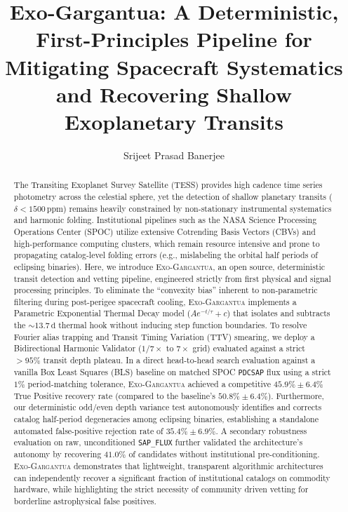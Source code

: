\documentclass[twocolumn,linenumbers]{aastex701}
\begin{document}
\title{Exo-Gargantua: A Deterministic, First-Principles Pipeline for Mitigating Spacecraft Systematics and Recovering Shallow Exoplanetary Transits}

\author[0009-0009-5889-9550]{Srijeet Prasad Banerjee}

\begin{abstract}
The Transiting Exoplanet Survey Satellite (TESS) provides high cadence time series photometry across the celestial sphere, yet the detection of shallow planetary transits ($\delta < 1500\,\text{ppm}$) remains heavily constrained by non-stationary instrumental systematics and harmonic folding. Institutional pipelines such as the NASA Science Processing Operations Center (SPOC) utilize extensive Cotrending Basis Vectors (CBVs) and high-performance computing clusters, which remain resource intensive and prone to propagating catalog-level folding errors (e.g., mislabeling the orbital half periods of eclipsing binaries). Here, we introduce \textsc{Exo-Gargantua}, an open source, deterministic transit detection and vetting pipeline, engineered strictly from first physical and signal processing principles. To eliminate the ``convexity bias'' inherent to non-parametric filtering during post-perigee spacecraft cooling, \textsc{Exo-Gargantua} implements a Parametric Exponential Thermal Decay model ($A e^{-t/\tau} + c$) that isolates and subtracts the $\sim 13.7\,\text{d}$ thermal hook without inducing step function boundaries. To resolve Fourier alias trapping and Transit Timing Variation (TTV) smearing, we deploy a Bidirectional Harmonic Validator ($1/7\times$ to $7\times$ grid) evaluated against a strict $>95\%$ transit depth plateau. In a direct head-to-head search evaluation against a vanilla Box Least Squares (BLS) baseline on matched SPOC \texttt{PDCSAP} flux using a strict $1\%$ period-matching tolerance, \textsc{Exo-Gargantua} achieved a competitive $45.9\% \pm 6.4\%$ True Positive recovery rate (compared to the baseline's $50.8\% \pm 6.4\%$). Furthermore, our deterministic odd/even depth variance test autonomously identifies and corrects catalog half-period degeneracies among eclipsing binaries, establishing a standalone automated false-positive rejection rate of $35.4\% \pm 6.9\%$. A secondary robustness evaluation on raw, unconditioned \texttt{SAP\_FLUX} further validated the architecture's autonomy by recovering $41.0\%$ of candidates without institutional pre-conditioning. \textsc{Exo-Gargantua} demonstrates that lightweight, transparent algorithmic architectures can independently recover a significant fraction of institutional catalogs on commodity hardware, while highlighting the strict necessity of community driven vetting for borderline astrophysical false positives.
\end{abstract}
\end{document}
